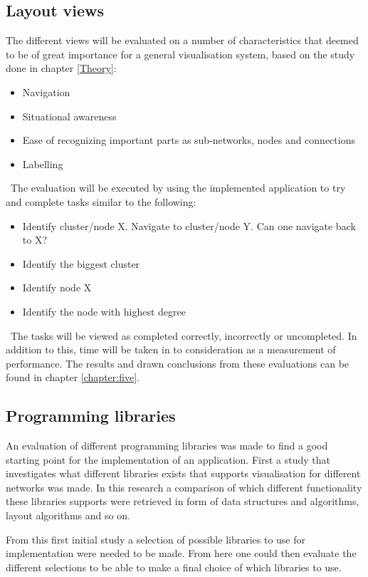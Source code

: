 \documentclass[a4paper,11pt]{kth-mag}
\begin{document}
\subsection{Layout views}
\label{sec:evaluation:layoutviews}
The different views will be evaluated on a number of characteristics that deemed to be of great importance for a general visualisation system, based on the study done in chapter \ref{Theory}:\
\begin{itemize}
	\item{Navigation}
	\item{Situational awareness}
	\item{Ease of recognizing important parts as sub-networks, nodes and connections}
	\item{Labelling}
\end{itemize}
\
The evaluation will be executed by using the implemented application to try and complete tasks similar to the following:\
\begin{itemize}
	\item{Identify cluster/node X. Navigate to cluster/node Y. Can one navigate back to X?}
	\item{Identify the biggest cluster}
	\item{Identify node X}
	\item{Identify the node with highest degree}
\end{itemize}
\
The tasks will be viewed as completed correctly, incorrectly or uncompleted. In addition to this, time will be taken in to consideration as a measurement of performance. The results and drawn conclusions from these evaluations
can be found in chapter \ref{chapter:five}.
\subsection{Programming libraries}
\label{sec:evaluation:libraries}
An evaluation of different programming libraries was made to find a good starting point for the implementation of an application. First a study that investigates what different libraries exists that supports visualisation 
for different networks was made. In this research a comparison of which different functionality these libraries supports were retrieved in form of data structures and algorithms, layout algorithms and so on.

From this first initial study a selection of possible libraries to use for implementation were needed to be made. From here one could then evaluate the different selections to be able to make a final choice
 of which libraries to use.
\end{document}
